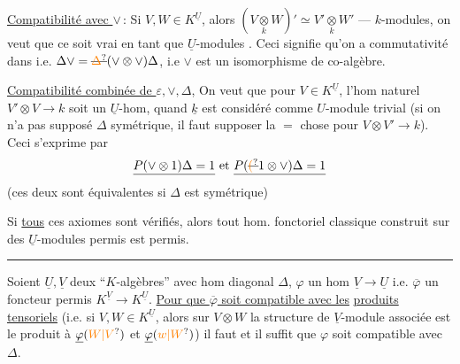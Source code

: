\uline{Compatibilité avec $\vee$}\,:  Si $V,W\in K^{\underline U}$,
alors $(V\underset{k}{\otimes}W)' \simeq V'\underset{k}{\otimes}W'$ --- 
$k$-modules, on veut que ce soit vrai
en tant que $\underline U$-modules . Ceci
signifie qu'on a commutativité dans
i.e. $\Delta\vee=\deleted{\unsure{\Delta}}(\vee\otimes\vee)\Delta$, i.e $\vee$ est un
isomorphisme de co-algèbre.

\uline{Compatibilité combinée de $\varepsilon,\vee,\Delta$}, On veut que
pour $V\in K^{\underline U}$, l'hom naturel $V'\otimes V\longrightarrow k$
soit un $\underline U$-hom, quand $\underline k$ est considéré comme
$U$-module trivial (si on n'a pas supposé $\Delta$
symétrique, il faut supposer la $=$ chose pour
$V\otimes V'\longrightarrow k$). Ceci s'exprime par
\[ \underline{P(\vee\otimes1)\Delta=1}\ \text{et}\ \underline{P(\deleted{\unsure{(}}1\otimes\vee)\Delta=1} \]
(ces deux sont équivalentes si $\Delta$ est symétrique)

Si \uline{tous} ces axiomes sont vérifiés, alors
tout hom. fonctoriel classique construit sur
des $\underline U$-modules permis est permis.


\noindent\rule{2.5cm}{0.4pt}

Soient $\underline U,\underline V$ deux ``$K$-algèbres'' avec
hom diagonal $\Delta$, $\varphi$ un hom  $\underline V\longrightarrow\underline U$
i.e. $\overline\varphi$ un foncteur permis $K^{\underline V}\longrightarrow K^{\underline U}$.
\uline{Pour que $\overline\varphi$ soit compatible avec les}
\uline{produits tensoriels} (i.e. si $V,W\in K^{\underline U}$,
alors sur $V\otimes W$ la structure de $\underline V$-module
associée est le produit  à $\underline\varphi(\unsure{W|V})$ et $\underline\varphi(\unsure{w|W})$) il faut et il suffit
que $\varphi$ soit compatible avec $\Delta$.

